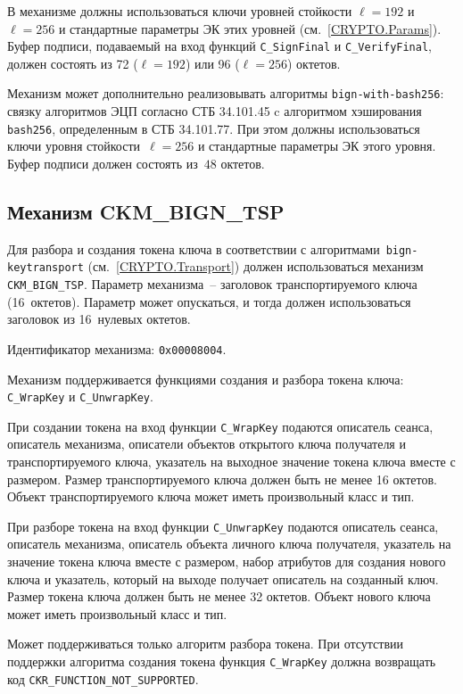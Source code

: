 В механизме должны использоваться ключи уровней стойкости $\ell=192$ 
и~$\ell=256$ и стандартные параметры ЭК этих уровней (см.~\ref{CRYPTO.Params}).
% 
Буфер подписи, подаваемый на вход функций \verb|C_SignFinal| и 
\verb|C_VerifyFinal|, должен состоять из 72 ($\ell=192$) или 96 ($\ell=256$) 
октетов. 

Механизм может дополнительно реализовывать алгоритмы 
\texttt{bign-with-bash256}: связку алгоритмов ЭЦП согласно СТБ 34.101.45 c 
алгоритмом хэширования \texttt{bash256}, определенным в СТБ 34.101.77.
При этом должны использоваться ключи уровня стойкости~$\ell=256$
и стандартные параметры ЭК этого уровня. 
Буфер подписи должен состоять из~$48$ октетов.

\subsection{Механизм CKM\_BIGN\_TSP}\label{CRYPTOKI.Transport}


Для разбора и создания токена ключа в соответствии с 
алгоритмами~\texttt{bign-keytransport} (см.~\ref{CRYPTO.Transport}) должен 
использоваться механизм \verb|CKM_BIGN_TSP|.
%
Параметр механизма~-- заголовок транспортируемого ключа (16~октетов). 
Параметр может опускаться, и тогда должен использоваться
заголовок из 16~нулевых октетов.

Идентификатор механизма: \texttt{0x00008004}.

Механизм поддерживается функциями создания и разбора токена ключа:
\verb|C_WrapKey| и \verb|C_UnwrapKey|.

При создании токена на вход функции \verb|C_WrapKey| подаются
описатель сеанса, описатель механизма, описатели объектов открытого ключа
получателя и транспортируемого ключа, указатель на
выходное значение токена ключа вместе с размером.
Размер транспортируемого ключа должен быть не менее 16 октетов.
Объект транспортируемого ключа может иметь произвольный класс и тип.

При разборе токена на вход функции \verb|C_UnwrapKey| подаются
описатель сеанса, описатель механизма, описатель объекта личного ключа
получателя, указатель на значение токена ключа вместе с размером,
набор атрибутов для создания нового ключа и указатель,
который на выходе получает описатель на созданный ключ.
Размер токена ключа должен быть не менее 32 октетов.
Объект нового ключа может иметь произвольный класс и тип.

Может поддерживаться только алгоритм разбора токена.
При отсутствии поддержки алгоритма создания токена
функция \verb|C_WrapKey| должна возвращать код 
\verb|CKR_FUNCTION_NOT_SUPPORTED|.

